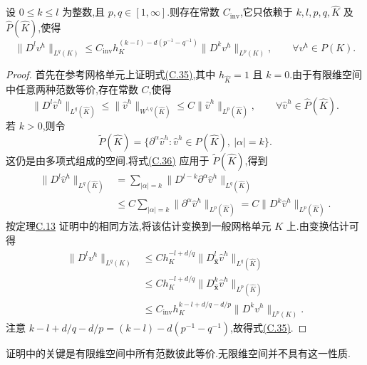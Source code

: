 \begin{theorem}[逆估计]\label{thm:appendix-c-30}
设 $0\le k\le l$ 为整数,且 $p,q\in[1,\infty]$.则存在常数 $C_{\mathrm{inv}}$,它只依赖于 $k,l,p,q,\widehat K$ 及 $\widehat P(\widehat K)$,使得
\begin{equation}\label{eq:appendix-c-35}
 \|D^l v^h\|_{L^q(K)}
 \le C_{\mathrm{inv}}h_K^{(k-l)-d(p^{-1}-q^{-1})}
       \|D^k v^h\|_{L^p(K)},
 \qquad \forall v^h\in P(K).
\end{equation}
\end{theorem}

\begin{proof}
首先在参考网格单元上证明式\hyperref[eq:appendix-c-35]{(C.35)},其中
$h_{\widehat K}=1$ 且 $k=0$.由于有限维空间中任意两种范数等价,存在常数 $C$,使得
\begin{equation}\label{eq:appendix-c-36}
 \|D^l\widehat v^h\|_{L^q(\widehat K)}
 \le\|\widehat v^h\|_{W^{l,q}(\widehat K)}
 \le C\|\widehat v^h\|_{L^p(\widehat K)},
 \qquad \forall\widehat v^h\in\widehat P(\widehat K).
\end{equation}
若 $k>0$,则令
\[
 \widetilde P(\widehat K)
 =\{\partial^\alpha\widehat v^h:
    \widehat v^h\in\widehat P(\widehat K),\ |\alpha|=k\}.
\]
这仍是由多项式组成的空间.将式\hyperref[eq:appendix-c-36]{(C.36)} 应用于
$\widetilde P(\widehat K)$,得到
\[
\begin{aligned}
 \|D^l\widehat v^h\|_{L^q(\widehat K)}
 &=\sum_{|\alpha|=k}
    \|D^{l-k}\partial^\alpha\widehat v^h\|_{L^q(\widehat K)}\\
 &\le C\sum_{|\alpha|=k}
    \|\partial^\alpha\widehat v^h\|_{L^p(\widehat K)}
 =C\|D^k\widehat v^h\|_{L^p(\widehat K)}.
\end{aligned}
\]
按定理\hyperref[thm:appendix-c-13]{C.13} 证明中的相同方法,将该估计变换到一般网格单元 $K$ 上.由变换估计可得
\[
\begin{aligned}
 \|D^l v^h\|_{L^q(K)}
 &\le Ch_K^{-l+d/q}
       \|D^l_{\widehat{\bm x}}\widehat v^h\|_{L^q(\widehat K)}\\
 &\le Ch_K^{-l+d/q}
       \|D^k_{\widehat{\bm x}}\widehat v^h\|_{L^p(\widehat K)}\\
 &\le C_{\mathrm{inv}}h_K^{k-l+d/q-d/p}
       \|D^k v^h\|_{L^p(K)}.
\end{aligned}
\]
注意 $k-l+d/q-d/p=(k-l)-d(p^{-1}-q^{-1})$,故得式\hyperref[eq:appendix-c-35]{(C.35)}.
\end{proof}

\begin{note}[关于证明]\label{note:appendix-c-31}
证明中的关键是有限维空间中所有范数彼此等价.无限维空间并不具有这一性质.
\end{note}

